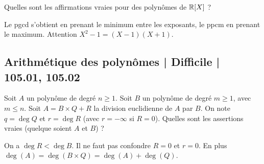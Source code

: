 \begin{question}
Quelles sont les affirmations vraies pour des polynômes de $\mathbb{R}[X]$ ?
\begin{answers}
    

    
\end{answers}
\begin{explanations}
Le pgcd s'obtient en prenant le minimum entre les exposants, le ppcm en prenant le maximum. Attention $X^2-1=(X-1)(X+1)$.
\end{explanations}
\end{question}




\subsection{Arithmétique des polynômes | Difficile | 105.01, 105.02}

\begin{question}
Soit $A$ un polynôme de degré $n\ge1$. Soit $B$ un polynôme de degré $m\ge1$, avec $m \le n$.
Soit $A = B \times Q + R$ la division euclidienne de $A$ par $B$. On note
$q = \deg Q$ et $r = \deg R$ (avec $r=-\infty$ si $R=0$).
Quelles sont les assertions vraies (quelque soient $A$ et $B$) ?
\begin{answers}



\end{answers}
\begin{explanations}
On a $\deg R < \deg B$. Il ne faut pas confondre $R=0$ et $r=0$.
En plus $\deg(A) = \deg(B\times Q) = \deg(A) + \deg(Q)$.
\end{explanations}
\end{question}


